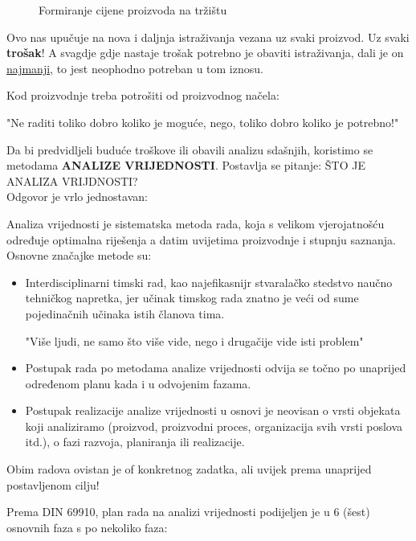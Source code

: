 \documentclass[a4paper,12pt]{article}
\numberwithin{figure}{section}
\begin{document}
\begin{figure}
\centering
 
\caption{Formiranje cijene proizvoda na tržištu}\label{Slika1}
\end{figure}
\FloatBarrier
\par
Ovo nas upučuje na nova i daljnja istraživanja vezana uz svaki proizvod. Uz svaki \textbf{trošak}! A svagdje gdje nastaje trošak potrebno je obaviti istraživanja, dali je on \underline{najmanji}, to jest neophodno potreban u tom iznosu.\par
Kod proizvodnje treba potrošiti od proizvodnog načela:
\begin{center}
"Ne raditi toliko dobro koliko je moguće, nego, toliko dobro koliko je potrebno!"
\end{center}
\par
Da bi predvidljeli buduće troškove ili obavili analizu sdašnjih, koristimo se metodama \textbf{ANALIZE VRIJEDNOSTI}. Postavlja se pitanje: ŠTO JE ANALIZA VRIJDNOSTI?\\
Odgovor je vrlo jednostavan:\par
Analiza vrijednosti je sistematska metoda rada, koja s velikom vjerojatnošću određuje optimalna riješenja a datim uvijetima proizvodnje i stupnju saznanja. \\
Osnovne značajke metode su:
\begin{itemize}
\item Interdisciplinarni timski rad, kao najefikasnijr stvaralačko stedstvo naučno tehničkog napretka, jer učinak timskog rada znatno je veći od sume pojedinačnih učinaka istih članova tima.
\begin{center}
"Više ljudi, ne samo što više vide, nego i drugačije vide isti problem"
\end{center}
\item Postupak rada po metodama analize vrijednosti odvija se točno po unaprijed  određenom planu kada i u odvojenim fazama.
\item Postupak realizacije analize vrijednosti u osnovi je neovisan o vrsti objekata koji analiziramo (proizvod, proizvodni proces, organizacija svih vrsti poslova itd.), o fazi razvoja, planiranja ili realizacije.
\end{itemize}
\par
Obim radova ovistan je of konkretnog zadatka, ali uvijek prema unaprijed postavljenom cilju!
\par
Prema DIN 69910, plan rada na analizi vrijednosti podijeljen je u 6 (šest) osnovnih faza s po nekoliko faza:
\end{document}
